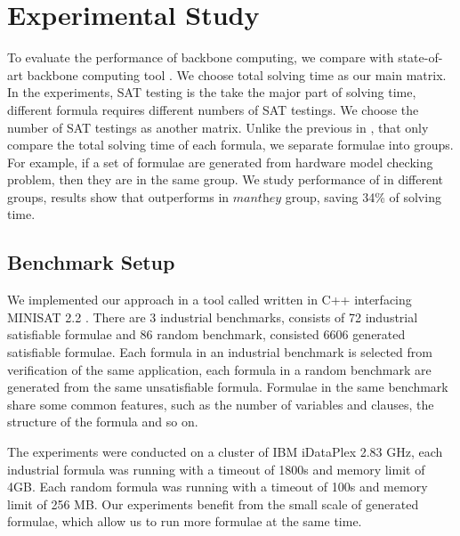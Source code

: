 \section{Experimental Study}\label{sec:expr}

To evaluate the performance of backbone computing, we compare \tool with state-of-art backbone computing tool \minibones. We choose total solving time as our main matrix. In the experiments, SAT testing is the take the major part of solving time, different formula requires different numbers of SAT testings. We choose the number of SAT testings as another matrix. Unlike the previous in \cite{JLM15}, that only compare the total solving time of each formula, we separate formulae into groups. For example, if a set of formulae are generated from hardware model checking problem, then they are in the same group. We study performance of \tool in different groups, results show that \tool outperforms \minibones in $\textit{manthey}$ group, saving 34\% of solving time.

\subsection{Benchmark Setup}
We implemented our approach in a tool called \tool written in C++ interfacing MINISAT 2.2 \cite{MINISAT}.
There are 3 industrial benchmarks, consists of 72 industrial satisfiable formulae and 86 random benchmark, consisted 6606 generated satisfiable formulae. Each formula in an industrial benchmark is selected from verification of the same application, each formula in a random benchmark are generated from the same unsatisfiable formula. Formulae in the same benchmark share some common features, such as the number of variables and clauses, the structure of the formula and so on.

The experiments were conducted on a cluster of IBM iDataPlex 2.83 GHz, each industrial formula was running with a timeout of 1800s and memory limit of 4GB. Each random formula was running with a timeout of 100s and memory limit of 256 MB. Our experiments benefit from the small scale of generated formulae, which allow us to run more formulae at the same time.

